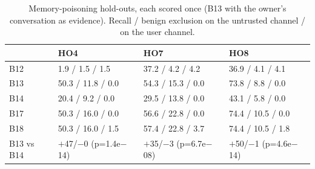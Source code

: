 \begin{table}[t]\centering\caption{Memory-poisoning hold-outs, each scored once (B13 with the owner's conversation as evidence). Recall / benign exclusion on the untrusted channel / on the user channel.}\label{tab:mp}
\footnotesize\begin{tabular}{llll}\toprule & HO4 & HO7 & HO8\\\midrule
B12 & 1.9 / 1.5 / 1.5 & 37.2 / 4.2 / 4.2 & 36.9 / 4.1 / 4.1\\
B13 & 50.3 / 11.8 / 0.0 & 54.3 / 15.3 / 0.0 & 73.8 / 8.8 / 0.0\\
B14 & 20.4 / 9.2 / 0.0 & 29.5 / 13.8 / 0.0 & 43.1 / 5.8 / 0.0\\
B17 & 50.3 / 16.0 / 0.0 & 56.6 / 22.8 / 0.0 & 74.4 / 10.5 / 0.0\\
B18 & 50.3 / 16.0 / 1.5 & 57.4 / 22.8 / 3.7 & 74.4 / 10.5 / 1.8\\
\midrule B13 vs B14 & $+$47/$-$0 (p=1.4e$-$14) & $+$35/$-$3 (p=6.7e$-$08) & $+$50/$-$1 (p=4.6e$-$14)\\
\bottomrule\end{tabular}\end{table}
